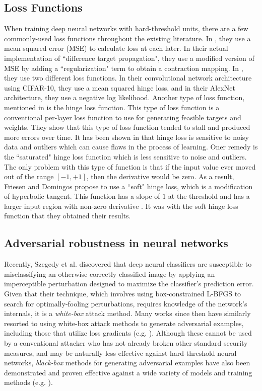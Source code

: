 \subsection{Loss Functions}

When training deep neural networks with hard-threshold units, there are a few commonly-used loss functions throughout the existing literature. In \cite{lee2015difference}, they use a mean squared error (MSE) to calculate loss at each later. In their actual implementation of ``difference target propagation", they use a modified version of MSE by adding a ``regularization" term to obtain a contraction mapping. In \cite{hubara2016quantized}, they use two different loss functions. In their convolutional network architecture using CIFAR-10, they use a mean squared hinge loss, and in their AlexNet architecture, they use a negative log likelihood. Another type of loss function, mentioned in \cite{friesen2017deep} is the hinge loss function. This type of loss function is a conventional per-layer loss function to use for generating feasible targets and weights. They show that this type of loss function tended to stall and produced more errors over time. It has been shown in \cite{wu2007robust} that hinge loss is sensitive to noisy data and outliers which can cause flaws in the process of learning. Oner remedy is the ``saturated" hinge loss function which is less sensitive to noise and outliers. The only problem with this type of function is that if the input value ever moved out of the range $[-1,+1]$, then the derivative would be zero. As a result, Friesen and Domingos propose to use a ``soft" hinge loss, which is a modification of hyperbolic tangent. This function has a slope of $1$ at the threshold and has a larger input region with non-zero derivative \cite{friesen2017deep}. It was with the soft hinge loss function that they obtained their results.   


\subsection{Adversarial robustness in neural networks}
Recently, Szegedy et al. \cite{szegedy2014} discovered that deep neural classifiers are susceptible to misclassifying an otherwise correctly classified image by applying an imperceptible perturbation designed to maximize the classifier's prediction error. Given that their technique, which involves using box-constrained L-BFGS to search for optimally-fooling perturbations, requires knowledge of the network's internals, it is a \textit{white-box} attack method. Many works since then have similarly resorted to using white-box attack methods to generate adversarial examples, including those that utilize loss gradients (e.g. \cite{goodfellow2014, dezfooli2016, papernot2016a, rauber2017}). Although these cannot be used by a conventional attacker who has not already broken other standard security measures, and may be naturally less effective against hard-threshold neural networks, \textit{black-box} methods for generating adversarial examples have also been demonstrated and proven effective against a wide variety of models and training methods (e.g. \cite{papernot2017, liu2016}).

